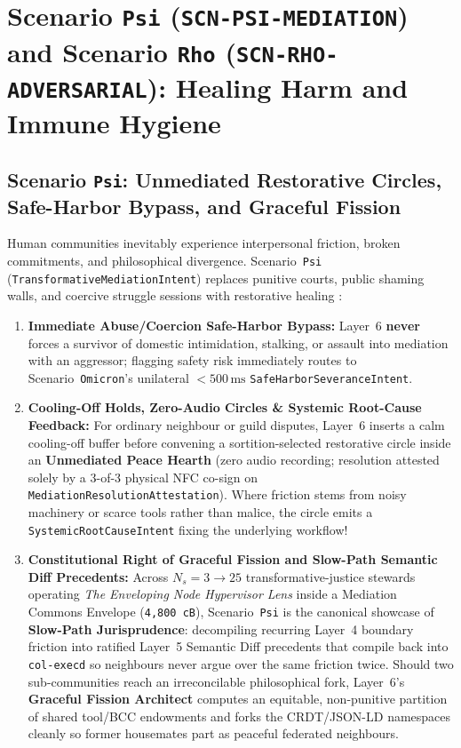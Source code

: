 \section{Scenario \texttt{Psi} (\texttt{SCN-PSI-MEDIATION}) and Scenario \texttt{Rho} (\texttt{SCN-RHO-ADVERSARIAL}): Healing Harm and Immune Hygiene}
\label{sec:wave-f-psi-rho}

\subsection{Scenario \texttt{Psi}: Unmediated Restorative Circles, Safe-Harbor Bypass, and Graceful Fission}

Human communities inevitably experience interpersonal friction, broken commitments, and philosophical divergence. Scenario~\texttt{Psi} (\texttt{TransformativeMediationIntent}) replaces punitive courts, public shaming walls, and coercive struggle sessions with restorative healing \parencite{zehr1990,hirschman1970}:
\begin{enumerate}
    \item \textbf{Immediate Abuse/Coercion Safe-Harbor Bypass:} Layer~6 \textbf{never} forces a survivor of domestic intimidation, stalking, or assault into mediation with an aggressor; flagging safety risk immediately routes to Scenario~\texttt{Omicron}'s unilateral $< 500\,\mathrm{ms}$ \texttt{SafeHarborSeveranceIntent}.
    \item \textbf{Cooling-Off Holds, Zero-Audio Circles \& Systemic Root-Cause Feedback:} For ordinary neighbour or guild disputes, Layer~6 inserts a calm cooling-off buffer before convening a sortition-selected restorative circle inside an \textbf{Unmediated Peace Hearth} (zero audio recording; resolution attested solely by a 3-of-3 physical NFC co-sign on \texttt{MediationResolutionAttestation}). Where friction stems from noisy machinery or scarce tools rather than malice, the circle emits a \texttt{SystemicRootCauseIntent} fixing the underlying workflow!
    \item \textbf{Constitutional Right of Graceful Fission and Slow-Path Semantic Diff Precedents:} Across $N_s = 3 \to 25$ transformative-justice stewards operating \textit{The Enveloping Node Hypervisor Lens} inside a Mediation Commons Envelope (\texttt{4,800 cB}), Scenario~\texttt{Psi} is the canonical showcase of \textbf{Slow-Path Jurisprudence}: decompiling recurring Layer~4 boundary friction into ratified Layer~5 Semantic Diff precedents that compile back into \texttt{col-execd} so neighbours never argue over the same friction twice. Should two sub-communities reach an irreconcilable philosophical fork, Layer~6's \textbf{Graceful Fission Architect} computes an equitable, non-punitive partition of shared tool/BCC endowments and forks the CRDT/JSON-LD namespaces cleanly so former housemates part as peaceful federated neighbours.
\end{enumerate}

